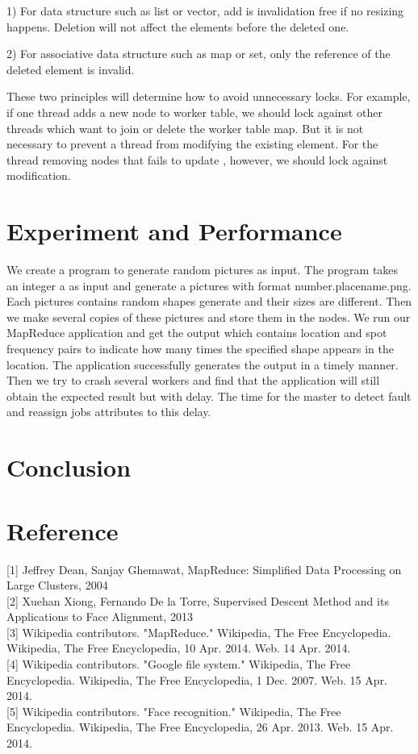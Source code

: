 \documentclass[12pt]{article}
\begin{document}
1) For data structure such as list or vector, add is invalidation free if no resizing happens. Deletion will not affect the elements before the deleted one.

2) For associative data structure such as map or set, only the reference of the deleted element is invalid.

These two principles will determine how to avoid unnecessary locks. For example, if one thread adds a new node to worker table, we should lock against other threads which want to join or delete the worker table map. But it is not necessary to prevent a thread from modifying the existing element. For the thread removing nodes that fails to update , however, we should lock against modification.        
   

\section{Experiment and Performance }

We create a program to generate random pictures as input. The program takes an integer a as input and generate a pictures with format number.placename.png.  Each pictures contains random shapes generate and their sizes are different. Then we make several copies of these pictures and store them in the nodes. We run our MapReduce application and get the output which contains location and spot frequency pairs to indicate how many times the specified shape appears in the location. The application successfully generates the output in a timely manner. Then we try to crash several workers and find that the application will still obtain the expected result but with delay. The time for the master to detect fault and reassign jobs attributes to this delay.
  
\section {Conclusion}

\section*{Reference}

[1] Jeffrey Dean, Sanjay Ghemawat, MapReduce: Simplified Data Processing on Large Clusters, 2004 \\
{[2]} Xuehan Xiong, Fernando De la Torre, Supervised Descent Method and its Applications to Face Alignment, 2013\\
{[3]} Wikipedia contributors. "MapReduce." Wikipedia, The Free Encyclopedia. Wikipedia, The Free Encyclopedia, 10 Apr. 2014. Web. 14 Apr. 2014. \\
{[4]} Wikipedia contributors. "Google file system." Wikipedia, The Free Encyclopedia. Wikipedia, The Free Encyclopedia, 1 Dec. 2007. Web. 15 Apr. 2014. \\
{[5]} Wikipedia contributors. "Face recognition." Wikipedia, The Free Encyclopedia. Wikipedia, The Free Encyclopedia, 26 Apr. 2013. Web. 15 Apr. 2014.
\end{document}
